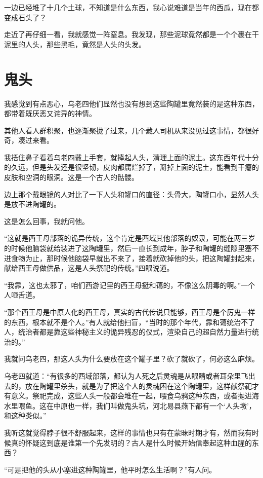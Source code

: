 一边已经堆了十几个土球，不知道是什么东西，我心说难道是当年的西瓜，现在都变成石头了？

走近了再仔细一看，我就感觉一阵窒息。我发现，那些泥球竟然都是一个个裹在干泥里的人头，那些黑毛，竟然是人头的头发。

\chapter{鬼头}

我感觉到有点恶心，乌老四他们显然也没有想到这些陶罐里竟然装的是这种东西，都带着既厌恶又诧异的神情。

其他人看人群积聚，也逐渐聚拢了过来，几个藏人司机从来没见过这事情，都很好奇，凑过来看。

我捂住鼻子看着乌老四戴上手套，就捧起人头，清理上面的泥土。这东西年代十分的久远，但是头发还是很坚韧，皮肉都腐烂掉了，掰掉上面的泥土，能看到干瘪的皮肤和空洞的眼洞。这是一个古人的骷髅。

边上那个戴眼镜的人对比了一下人头和罐口的直径：头骨大，陶罐口小，显然人头是放不进陶罐的。

这是怎么回事，我就问他。

“这就是西王母部落的诡异传统，这个肯定是西域其他部落的奴隶，可能在两三岁的时候他脑袋就给装进了这陶罐里，然后一直长到成年，脖子和陶罐的缝隙里塞不进食物为止，那时候他脑袋早就出不来了，接着就砍掉他的头，把这陶罐封起来，献给西王母做供品，这是人头祭祀的传统。”四眼说道。

“我靠，这也太邪了，咱们西游记里的西王母挺和蔼的，不像这么阴毒的啊。”一个人咂舌道。

“那个西王母是中原人化的西王母，真实的古代传说只能够，西王母是个厉鬼一样的东西，根本就不是个人。”有人就给他扫盲，“当时的那个年代，靠和蔼统治不了人，统治者都是靠这些神秘主义的诡异残忍的仪式，渲染自己的超自然力量进行统治的。”

我就问乌老四，那这人头为什么要放在这个罐子里？砍了就砍了，何必这么麻烦。

乌老四就道：“有很多的西域部落，都认为人死之后灵魂是从眼睛或者耳朵里飞出去的，放在陶罐里杀头，就是为了把这个人的灵魂困在这个陶罐里，这样献祭祀才有意义。祭祀完成，这些人头一般都会堆在一起，喂食乌鸦这种东西，或者抛进海水里喂鱼。这在中原也一样，我们叫做鬼头坑，河北易县燕下都有一个‘人头墩’，和这种类似。”

我听这就觉得脖子很不舒服起来，这样的事情也只有在蒙昧时期才有，然而我有时候真的怀疑这到底是谁第一个先发明的？古人是什么时候开始信奉起这种血腥的东西？

“可是把他的头从小塞进这种陶罐里，他平时怎么生活啊？”有人问。

